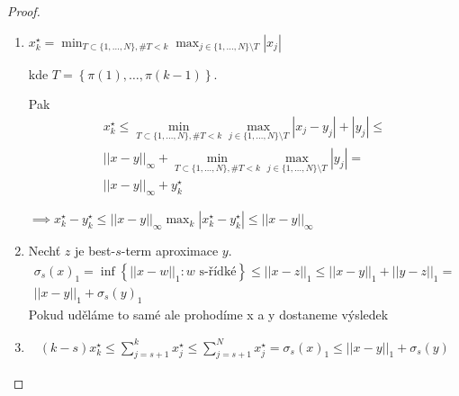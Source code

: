 \documentclass[../main.tex]{subfiles}
\begin{document}
\begin{proof}
    \hphantom{1}
    \begin{enumerate}
        \item 
            $x_k^\star = \min_{T\subset\{1,\dots,N\}, \# T<k} \max_{j\in\{1,\dots,N\}\setminus T} |x_j|$

            kde $T = \left\{\pi(1),\dots, \pi(k-1)\right\}$.

            Pak 
            \begin{multline}
                x_k^\star \leq \min_{T\subset\{1,\dots,N\}, \# T<k} \max_{j\in\{1,\dots,N\}\setminus T} |x_j-y_j| + |y_j| \leq \\ 
                ||x-y||_\infty + \min_{T\subset\{1,\dots,N\}, \# T<k} \max_{j\in\{1,\dots,N\}\setminus T} |y_j| = \\
                ||x-y||_\infty + y_k^\star
            \end{multline}

            $\implies x_k^\star - y_k^\star \leq ||x-y||_\infty \max_k |x_k^\star - y_k^\star| \leq ||x-y||_\infty$
            
        \item 
            Nechť $z$ je best-$s$-term aproximace $y$. 
            \begin{multline}
                \sigma_s(x)_1 = \inf \left\{||x-w||_1: w\text{ s-řídké}\right\} \leq ||x-z||_1 \leq ||x-y||_1 + ||y-z||_1 =
                \\ ||x-y||_1 + \sigma_s(y)_1
            \end{multline}
            Pokud uděláme to samé  ale prohodíme x a y dostaneme výsledek
            
        \item
        \begin{multline}
            (k-s) x_k^\star \leq \sum_{j=s+1}^{k} x_j^\star \leq \sum_{j=s+1}^{N} x_j^\star = \sigma_s(x)_1 \leq  ||x-y||_1+\sigma_s(y)
        \end{multline}
    \end{enumerate}
\end{proof}
\end{document}
